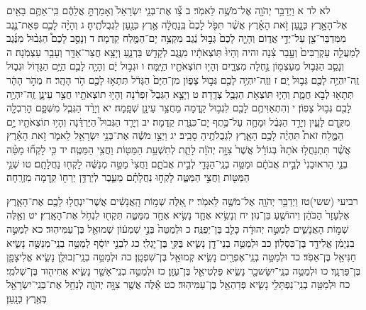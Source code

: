 \documentclass[twoside, openany, parskip=half, 11pt]{book}
\begin{document}
לא לד א וַיְדַבֵּ֥ר יְהֹוָ֖ה אֶל־מֹשֶׁ֥ה לֵּאמֹֽר׃ ב צַ֞ו אֶת־בְּנֵ֤י יִשְׂרָאֵל֙ וְאָמַרְתָּ֣ אֲלֵהֶ֔ם כִּֽי־אַתֶּ֥ם בָּאִ֖ים אֶל־הָאָ֣רֶץ כְּנָ֑עַן זֹ֣את הָאָ֗רֶץ אֲשֶׁ֨ר תִּפֹּ֤ל לָכֶם֙ בְּֽנַחֲלָ֔ה אֶ֥רֶץ כְּנַ֖עַן לִגְבֻלֹתֶֽיהָ׃ ג וְהָיָ֨ה לָכֶ֧ם פְּאַת־נֶ֛גֶב מִמִּדְבַּר־צִ֖ן עַל־יְדֵ֣י אֱד֑וֹם וְהָיָ֤ה לָכֶם֙ גְּב֣וּל נֶ֔גֶב מִקְצֵ֥ה יָם־הַמֶּ֖לַח קֵֽדְמָה׃ ד וְנָסַ֣ב לָכֶם֩ הַגְּב֨וּל מִנֶּ֜גֶב לְמַעֲלֵ֤ה עַקְרַבִּים֙ וְעָ֣בַר צִ֔נָה והיה וְהָיוּ֙ תּֽוֹצְאֹתָ֔יו מִנֶּ֖גֶב לְקָדֵ֣שׁ בַּרְנֵ֑עַ וְיָצָ֥א חֲצַר־אַדָּ֖ר וְעָבַ֥ר עַצְמֹֽנָה׃ ה וְנָסַ֧ב הַגְּב֛וּל מֵעַצְמ֖וֹן נַ֣חְלָה מִצְרָ֑יִם וְהָי֥וּ תוֹצְאֹתָ֖יו הַיָּֽמָּה׃ ו וּגְב֣וּל יָ֔ם וְהָיָ֥ה לָכֶ֛ם הַיָּ֥ם הַגָּד֖וֹל וּגְב֑וּל זֶֽה־יִהְיֶ֥ה לָכֶ֖ם גְּב֥וּל יָֽם׃ ז וְזֶֽה־יִהְיֶ֥ה לָכֶ֖ם גְּב֣וּל צָפ֑וֹן מִן־הַיָּם֙ הַגָּדֹ֔ל תְּתָא֥וּ לָכֶ֖ם הֹ֥ר הָהָֽר׃ ח מֵהֹ֣ר הָהָ֔ר תְּתָא֖וּ לְבֹ֣א חֲמָ֑ת וְהָי֛וּ תּוֹצְאֹ֥ת הַגְּבֻ֖ל צְדָֽדָה׃ ט וְיָצָ֤א הַגְּבֻל֙ זִפְרֹ֔נָה וְהָי֥וּ תוֹצְאֹתָ֖יו חֲצַ֣ר עֵינָ֑ן זֶֽה־יִהְיֶ֥ה לָכֶ֖ם גְּב֥וּל צָפֽוֹן׃ י וְהִתְאַוִּיתֶ֥ם לָכֶ֖ם לִגְב֣וּל קֵ֑דְמָה מֵחֲצַ֥ר עֵינָ֖ן שְׁפָֽמָה׃ יא וְיָרַ֨ד הַגְּבֻ֧ל מִשְּׁפָ֛ם הָרִבְלָ֖ה מִקֶּ֣דֶם לָעָ֑יִן וְיָרַ֣ד הַגְּבֻ֔ל וּמָחָ֛ה עַל־כֶּ֥תֶף יָם־כִּנֶּ֖רֶת קֵֽדְמָה׃ יב וְיָרַ֤ד הַגְּבוּל֙ הַיַּרְדֵּ֔נָה וְהָי֥וּ תוֹצְאֹתָ֖יו יָ֣ם הַמֶּ֑לַח זֹאת֩ תִּהְיֶ֨ה לָכֶ֥ם הָאָ֛רֶץ לִגְבֻלֹתֶ֖יהָ סָבִֽיב׃ יג וַיְצַ֣ו מֹשֶׁ֔ה אֶת־בְּנֵ֥י יִשְׂרָאֵ֖ל לֵאמֹ֑ר זֹ֣את הָאָ֗רֶץ אֲשֶׁ֨ר תִּתְנַחֲל֤וּ אֹתָהּ֙ בְּגוֹרָ֔ל אֲשֶׁר֙ צִוָּ֣ה יְהֹוָ֔ה לָתֵ֛ת לְתִשְׁעַ֥ת הַמַּטּ֖וֹת וַחֲצִ֥י הַמַּטֶּֽה׃ יד כִּ֣י לָקְח֞וּ מַטֵּ֨ה בְנֵ֤י הָראוּבֵנִי֙ לְבֵ֣ית אֲבֹתָ֔ם וּמַטֵּ֥ה בְנֵֽי־הַגָּדִ֖י לְבֵ֣ית אֲבֹתָ֑ם וַחֲצִי֙ מַטֵּ֣ה מְנַשֶּׁ֔ה לָקְח֖וּ נַחֲלָתָֽם׃ טו שְׁנֵ֥י הַמַּטּ֖וֹת וַחֲצִ֣י הַמַּטֶּ֑ה לָקְח֣וּ נַחֲלָתָ֗ם מֵעֵ֛בֶר לְיַרְדֵּ֥ן יְרֵח֖וֹ קֵ֥דְמָה מִזְרָֽחָה׃

רביעי (ששי)טז וַיְדַבֵּ֥ר יְהֹוָ֖ה אֶל־מֹשֶׁ֥ה לֵּאמֹֽר׃ יז אֵ֚לֶּה שְׁמ֣וֹת הָֽאֲנָשִׁ֔ים אֲשֶׁר־יִנְחֲל֥וּ לָכֶ֖ם אֶת־הָאָ֑רֶץ אֶלְעָזָר֙ הַכֹּהֵ֔ן וִיהוֹשֻׁ֖עַ בִּן־נֽוּן׃ יח וְנָשִׂ֥יא אֶחָ֛ד נָשִׂ֥יא אֶחָ֖ד מִמַּטֶּ֑ה תִּקְח֖וּ לִנְחֹ֥ל אֶת־הָאָֽרֶץ׃ יט וְאֵ֖לֶּה שְׁמ֣וֹת הָאֲנָשִׁ֑ים לְמַטֵּ֣ה יְהוּדָ֔ה כָּלֵ֖ב בֶּן־יְפֻנֶּֽה׃ כ וּלְמַטֵּה֙ בְּנֵ֣י שִׁמְע֔וֹן שְׁמוּאֵ֖ל בֶּן־עַמִּיהֽוּד׃ כא לְמַטֵּ֣ה בִנְיָמִ֔ן אֱלִידָ֖ד בֶּן־כִּסְלֽוֹן׃ כב וּלְמַטֵּ֥ה בְנֵי־דָ֖ן נָשִׂ֑יא בֻּקִּ֖י בֶּן־יׇגְלִֽי׃ כג לִבְנֵ֣י יוֹסֵ֔ף לְמַטֵּ֥ה בְנֵֽי־מְנַשֶּׁ֖ה נָשִׂ֑יא חַנִּיאֵ֖ל בֶּן־אֵפֹֽד׃ כד וּלְמַטֵּ֥ה בְנֵֽי־אֶפְרַ֖יִם נָשִׂ֑יא קְמוּאֵ֖ל בֶּן־שִׁפְטָֽן׃ כה וּלְמַטֵּ֥ה בְנֵֽי־זְבוּלֻ֖ן נָשִׂ֑יא אֱלִיצָפָ֖ן בֶּן־פַּרְנָֽךְ׃ כו וּלְמַטֵּ֥ה בְנֵֽי־יִשָּׂשכָ֖ר נָשִׂ֑יא פַּלְטִיאֵ֖ל בֶּן־עַזָּֽן׃ כז וּלְמַטֵּ֥ה בְנֵי־אָשֵׁ֖ר נָשִׂ֑יא אֲחִיה֖וּד בֶּן־שְׁלֹמִֽי׃ כח וּלְמַטֵּ֥ה בְנֵֽי־נַפְתָּלִ֖י נָשִׂ֑יא פְּדַהְאֵ֖ל בֶּן־עַמִּיהֽוּד׃ כט אֵ֕לֶּה אֲשֶׁ֖ר צִוָּ֣ה יְהֹוָ֑ה לְנַחֵ֥ל אֶת־בְּנֵֽי־יִשְׂרָאֵ֖ל בְּאֶ֥רֶץ כְּנָֽעַן׃
\end{document}
